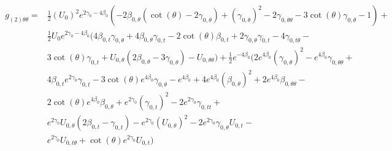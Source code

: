 \documentclass[a4paper,11pt]{article}
\numberwithin{equation}{section}
\begin{document}
\begin{subequations}
\begin{align}
\begin{split}
g_{(2) \theta \theta}=&\frac{1}{2} (U_{0})^2 e^{2 \gamma_{0}-4 \beta_{0}} (-2 \beta_{0, \theta} (\cot (\theta )-2 \gamma_{0, \theta})+(\gamma_{0, \theta})^2-2 \gamma_{0, \theta \theta}-3 \cot (\theta ) \gamma_{0, \theta}-1)+\\
&\frac{1}{2} U_{0} e^{2 \gamma_{0}-4 \beta_{0}} (4 \beta_{0, t} \gamma_{0, \theta}+4 \beta_{0, \theta} \gamma_{0, t}-2 \cot (\theta ) \beta_{0, t}+2 \gamma_{0, \theta} \gamma_{0, t}-4 \gamma_{0, t \theta}-\\
&3 \cot (\theta ) \gamma_{0, t}+U_{0, \theta} (2 \beta_{0, \theta}-3 \gamma_{0, \theta})-U_{0, \theta \theta})+\frac{1}{2} e^{-4 \beta_{0}} (2 e^{4 \beta_{0}} (\gamma_{0, \theta})^2-e^{4 \beta_{0}} \gamma_{0, \theta \theta}+\\
&4 \beta_{0, t} e^{2 \gamma_{0}} \gamma_{0, t}-3 \cot (\theta ) e^{4 \beta_{0}} \gamma_{0, \theta}-e^{4 \beta_{0}}+4 e^{4 \beta_{0}} (\beta_{0, \theta})^2+2 e^{4 \beta_{0}} \beta_{0, \theta \theta}-\\
&2 \cot (\theta ) e^{4 \beta_{0}} \beta_{0, \theta}+e^{2 \gamma_{0}} (\gamma_{0, t})^2-2 e^{2 \gamma_{0}} \gamma_{0, t t}+\\
&e^{2 \gamma_{0}} U_{0, \theta} (2 \beta_{0, t}-\gamma_{0, t})-e^{2 \gamma_{0}} (U_{0, \theta})^2-2 e^{2 \gamma_{0}} \gamma_{0, \theta} U_{0, t}-\\
&e^{2 \gamma_{0}} U_{0, t \theta}+\cot (\theta ) e^{2 \gamma_{0}} U_{0, t})
\end{split}
\end{align}


\end{subequations}
\end{document}
